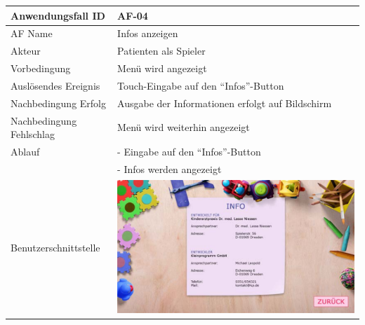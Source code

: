 \documentclass[12pt]{article}
\begin{document}
\begin{tabularx}{\textwidth}{|l|X|} \hline
Anwendungsfall ID&AF-04\\ \hline
AF Name&Infos anzeigen\\ \hline
Akteur&Patienten als Spieler\\ \hline
Vorbedingung&Menü wird angezeigt\\ \hline
Auslösendes Ereignis&Touch-Eingabe auf den "`Infos"'-\Gls{Button}\\ \hline
Nachbedingung Erfolg&Ausgabe der Informationen erfolgt auf Bildschirm\\ \hline
Nachbedingung Fehlschlag&Menü wird weiterhin angezeigt\\ \hline
Ablauf&- Eingabe auf den "`Infos"'-\Gls{Button}\\&- Infos werden angezeigt\\ \hline
Benutzerschnittstelle&\includegraphics[scale=0.33]{Info.pdf}
\\ \hline
\end{tabularx}\\
\end{document}
